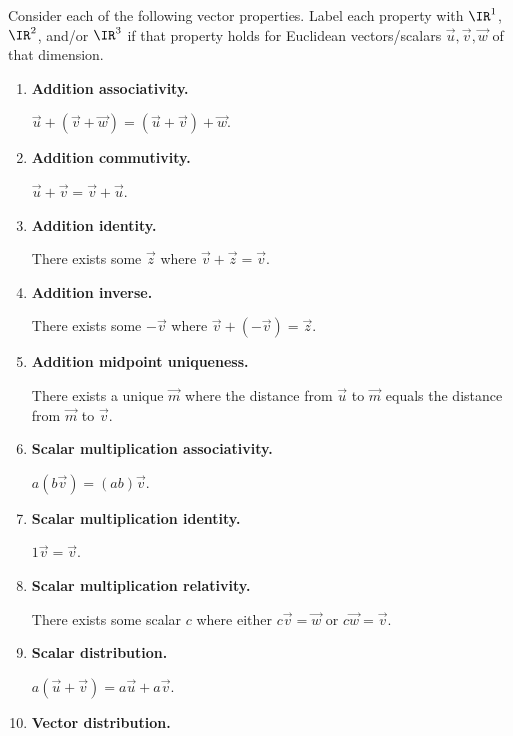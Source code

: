 
\begin{applicationActivities}


\begin{activity}{20}\smallSlideText
Consider each of the following vector properties. Label each property
with \(\IR^1\), \(\IR^2\), and/or \(\IR^3\) if that property holds for
Euclidean vectors/scalars \(\vec u,\vec v,\vec w\) of that dimension.
\begin{multicols}{2}
\begin{enumerate}
  \item \textbf{Addition associativity.}

        \(\vec u+(\vec v+\vec w)=
        (\vec u+\vec v)+\vec w\).
  \item \textbf{Addition commutivity.}

        \(\vec u+\vec v=
        \vec v+\vec u\).
  \item \textbf{Addition identity.}

        There exists some \(\vec z\)
        where \(\vec v+\vec z=\vec v\).
  \item \textbf{Addition inverse.}

        There exists some \(-\vec v\)
        where \(\vec v+(-\vec v)=\vec z\).
  \item \textbf{Addition midpoint uniqueness.}

        There exists a unique \(\vec m\) where the distance from
        \(\vec u\) to \(\vec m\) equals the distance from \(\vec m\)
        to \(\vec v\).
  \item \textbf{Scalar multiplication associativity.}

        \(a(b\vec v)=(ab)\vec v\).
  \item \textbf{Scalar multiplication identity.}

        \(1\vec v=\vec v\).
  \item \textbf{Scalar multiplication relativity.}

        There exists some scalar \(c\) where either \(c\vec v=\vec w\)
        or \(c\vec w=\vec v\).
  \item \textbf{Scalar distribution.}

        \(a(\vec u+\vec v)=a\vec u+a\vec v\).
  \item \textbf{Vector distribution.}


\end{enumerate}
\end{multicols}
\end{activity}
\end{applicationActivities}
